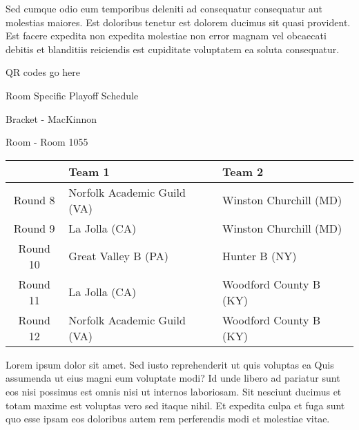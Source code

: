 \documentclass{article}%
\begin{document}
\newline%
Sed cumque odio eum temporibus deleniti ad consequatur consequatur aut molestias maiores. Est doloribus tenetur est dolorem ducimus sit quasi provident. Est facere expedita non expedita molestiae non error magnam vel obcaecati debitis et blanditiis reiciendis est cupiditate voluptatem ea soluta consequatur.%
\vspace*{140pt}%
\begin{center}%
\begin{Huge}%
QR codes go here%
\end{Huge}%
\end{center}%
\newpage%
\begin{center}%
\begin{Huge}%
Room Specific Playoff Schedule%
\end{Huge}%
\vspace*{8pt}%
\linebreak%
\begin{Large}%
Bracket {-} MacKinnon%
\end{Large}%
\vspace*{8pt}%
\linebreak%
\vspace*{8pt}%
\begin{Large}%
Room {-} Room 1055%
\end{Large}%
\end{center}%
%
\begin{tabularx}{\textwidth}{|c|Y|Y|}%
\hline%
&Team 1&Team 2\\%
\hline%
Round 8&Norfolk Academic Guild (VA)&Winston Churchill (MD)\\%
Round 9&La Jolla (CA)&Winston Churchill (MD)\\%
Round 10&Great Valley B (PA)&Hunter B (NY)\\%
Round 11&La Jolla (CA)&Woodford County B (KY)\\%
Round 12&Norfolk Academic Guild (VA)&Woodford County B (KY)\\%
\hline%
\end{tabularx}%
\vspace*{8pt}%
\newline%
Lorem ipsum dolor sit amet. Sed iusto reprehenderit ut quis voluptas ea Quis assumenda ut eius magni eum voluptate modi? Id unde libero ad pariatur sunt eos nisi possimus est omnis nisi ut internos laboriosam. Sit nesciunt ducimus et totam maxime est voluptas vero sed itaque nihil. Et expedita culpa et fuga sunt quo esse ipsam eos doloribus autem rem perferendis modi et molestiae vitae.\newline%
\end{document}
